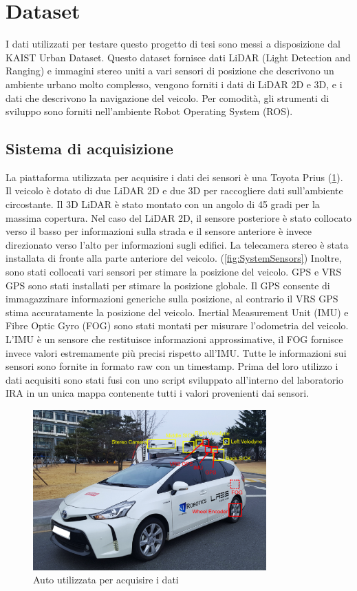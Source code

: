 \section*{Dataset}
I dati utilizzati per testare questo progetto di tesi sono messi a disposizione dal KAIST Urban Dataset\cite{jeong2019complex}.
Questo dataset fornisce dati LiDAR (Light Detection and Ranging) e immagini stereo uniti a vari sensori di posizione che descrivono un ambiente urbano molto complesso, vengono forniti i dati di LiDAR 2D e 3D, e i dati che descrivono la navigazione del veicolo. Per comodità, gli strumenti di sviluppo sono forniti nell'ambiente Robot Operating System (ROS).

\subsection*{Sistema di acquisizione}
La piattaforma utilizzata per acquisire i dati dei sensori è una Toyota Prius (\ref{fig:SystemCar}). Il veicolo è dotato di due LiDAR 2D e due 3D per raccogliere dati sull'ambiente circostante. Il 3D LiDAR è stato montato con un angolo di 45 gradi per la massima copertura. Nel caso del LiDAR 2D, il sensore posteriore è stato collocato verso il basso per informazioni sulla strada e il sensore anteriore è invece direzionato verso l'alto per informazioni sugli edifici. La telecamera stereo è stata installata di fronte alla parte anteriore del veicolo. (\ref{fig:SystemSensors})
Inoltre, sono stati collocati vari sensori per stimare la posizione del veicolo. GPS e VRS GPS sono stati installati per stimare la posizione globale. Il GPS consente di immagazzinare informazioni generiche sulla posizione, al contrario il VRS GPS stima accuratamente la posizione del veicolo. Inertial Measurement Unit (IMU) e Fibre Optic Gyro (FOG) sono stati montati per misurare l'odometria del veicolo. L'IMU è un sensore che restituisce informazioni approssimative, il FOG fornisce invece valori estremamente più precisi rispetto all'IMU. Tutte le informazioni sui sensori sono fornite in formato raw con un timestamp.
Prima del loro utilizzo i dati acquisiti sono stati fusi con uno script sviluppato all'interno del laboratorio IRA in un unica mappa contenente tutti i valori provenienti dai sensori.

\begin{figure}[H]
    \centering
    \includegraphics[width=0.8\textwidth]{Immagini/system_car.png}
    \caption{Auto utilizzata per acquisire i dati}
    \label{fig:SystemCar}
\end{figure}

